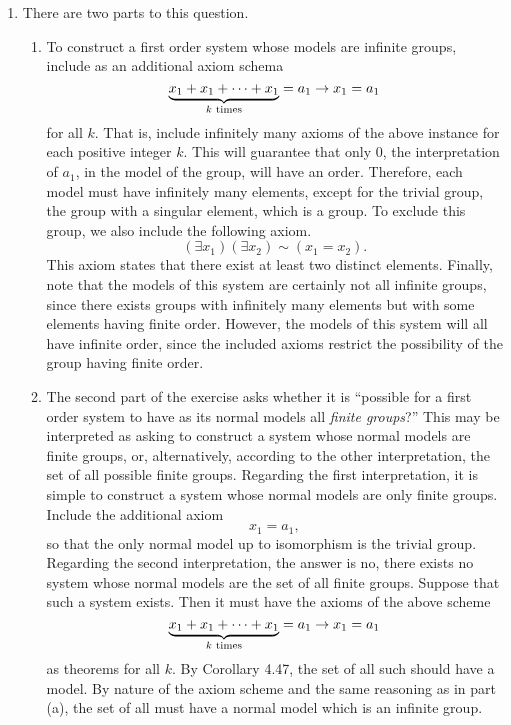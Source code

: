 \begin{enumerate}
  \item %
    There are two parts to this question. 
    \begin{enumerate}
      \item To construct a first order system whose models are infinite groups, include as an additional axiom schema
        \[\underbrace{x_1 + x_1 + \dots + x_1}_{k \text{ times}} = a_1 \rightarrow x_1 = a_1\]
        for all \(k\). That is, include infinitely many axioms of the above instance for each positive integer \(k\). This will guarantee that only 0, the interpretation of \(a_1\), in the model of the group, will have an order. Therefore, each model must have infinitely many elements, except for the trivial group, the group with a singular element, which is a group. To exclude this group, we also include the following axiom.
        \[(\exists x_1)(\exists x_2) \sim(x_1 = x_2).\]
        This axiom states that there exist at least two distinct elements. Finally, note that the models of this system are certainly not all infinite groups, since there exists groups with infinitely many elements but with some elements having finite order. However, the models of this system will all have infinite order, since the included axioms restrict the possibility of the group having finite order.

      \item The second part of the exercise asks whether it is ``possible for a first order system to have as its normal models all \textit{finite groups}?'' This may be interpreted as asking to construct a system whose normal models are finite groups, or, alternatively, according to the other interpretation, the set of all possible finite groups. Regarding the first interpretation, it is simple to construct a system whose normal models are only finite groups. Include the additional axiom
        \[x_1 = a_1,\]
        so that the only normal model up to isomorphism is the trivial group. Regarding the second interpretation, the answer is no, there exists no system whose normal models are the set of all finite groups. Suppose that such a system exists. Then it must have the axioms of the above scheme
        \[\underbrace{x_1 + x_1 + \dots + x_1}_{k \text{ times}} = a_1 \rightarrow x_1 = a_1\]
        as theorems for all \(k\). By Corollary 4.47, the set of all such \wf{} should have a model. By nature of the axiom scheme and the same reasoning as in part (a), the set of all \wfs{} must have a normal model which is an infinite group.
    \end{enumerate}


\end{enumerate}
